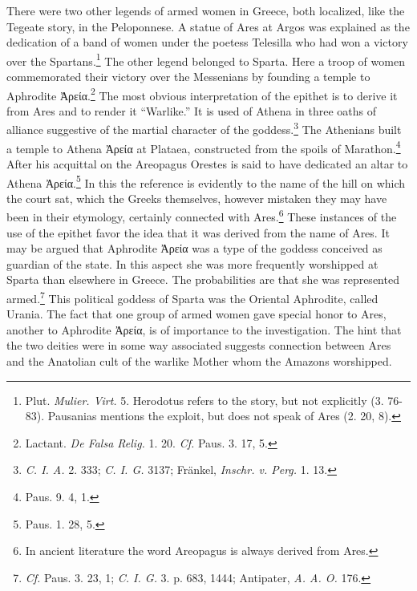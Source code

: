 \documentclass[a4paper, 12pt, oneside]{article}
\begin{document}
There were two other legends of armed women in Greece, both localized, like the Tegeate story, in the Peloponnese. A statue of Ares at Argos was explained as the dedication of a band of women under the poetess Telesilla who had won a victory over the Spartans.\footnote{Plut. \emph{Mulier. Virt.} 5. Herodotus refers to the story, but not explicitly (3. 76-83). Pausanias mentions the exploit, but does not speak of Ares (2. 20, 8).} The other legend belonged to Sparta. Here a troop of women commemorated their victory over the Messenians by founding a temple to Aphrodite Ἀρεία.\footnote{Lactant. \emph{De Falsa Relig.} 1. 20. \emph{Cf.} Paus. 3. 17, 5.} The most obvious interpretation of the epithet is to derive it from Ares and to render it ``Warlike.'' It is used of Athena in three oaths of alliance suggestive of the martial character of the goddess.\footnote{\emph{C. I. A.} 2. 333; \emph{C. I. G.} 3137; Fränkel, \emph{Inschr. v. Perg.} 1. 13.} The Athenians built a temple to Athena Ἀρεία at Plataea, constructed from the spoils of Marathon.\footnote{Paus. 9. 4, 1.} After his acquittal on the Areopagus Orestes is said to have dedicated an altar to Athena Ἀρεία.\footnote{Paus. 1. 28, 5.} In this the reference is evidently to the name of the hill on which the court sat, which the Greeks themselves, however mistaken they may have been in their etymology, certainly connected with Ares.\footnote{In ancient literature the word Areopagus is always derived from Ares.} These instances of the use of the epithet favor the idea that it was derived from the name of Ares. It may be argued that Aphrodite Ἀρεία was a type of the goddess conceived as guardian of the state. In this aspect she was more frequently worshipped at Sparta than elsewhere in Greece. The probabilities are that she was represented armed.\footnote{\emph{Cf.} Paus. 3. 23, 1; \emph{C. I. G.} 3. p. 683, 1444; Antipater, \emph{A. A. O.} 176.} This political goddess of Sparta was the Oriental Aphrodite, called Urania. The fact that one group of armed women gave special honor to Ares, another to Aphrodite Ἀρεία, is of importance to the investigation. The hint that the two deities were in some way associated suggests connection between Ares and the Anatolian cult of the warlike Mother whom the Amazons worshipped.
\end{document}
